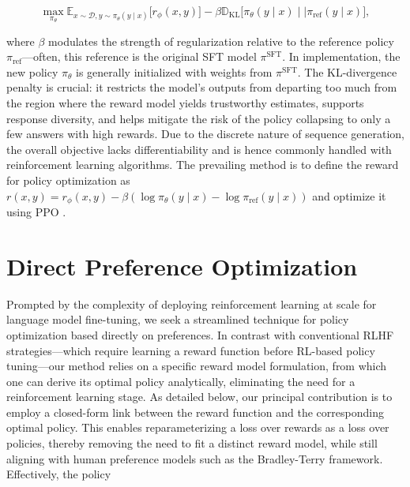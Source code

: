\begin{equation}\label{eq:RL}
\max_{\pi_{\theta}}  \mathbb{E}_{x\sim \mathcal{D}, y\sim \pi_{\theta}(y \mid x)}\bigl[r_{\phi}(x, y)\bigr] - \beta\mathbb{D}_{\textrm{KL}}\bigl[\pi_{\theta}(y\mid x)\mid \mid \pi_\text{ref}(y\mid x)\bigr],
\end{equation}

where $\beta$ modulates the strength of regularization relative to the reference policy $\pi_\text{ref}$—often, this reference is the original SFT model $\pi^\text{SFT}$. In implementation, the new policy $\pi_\theta$ is generally initialized with weights from $\pi^\text{SFT}$. The KL-divergence penalty is crucial: it restricts the model’s outputs from departing too much from the region where the reward model yields trustworthy estimates, supports response diversity, and helps mitigate the risk of the policy collapsing to only a few answers with high rewards. Due to the discrete nature of sequence generation, the overall objective lacks differentiability and is hence commonly handled with reinforcement learning algorithms. The prevailing method \citep{ziegler2020finetuning, stiennon2022learning, bai2022training, ouyang2022training} is to define the reward for policy optimization as ${r(x, y) = r_{\phi}(x, y) -\beta (\log \pi_{\theta}(y\mid x) - \log \pi_\text{ref}(y\mid x))}$ and optimize it using PPO \cite{schulman2017proximal}.

\section{Direct Preference Optimization}\label{sec:DPO}

Prompted by the complexity of deploying reinforcement learning at scale for language model fine-tuning, we seek a streamlined technique for policy optimization based directly on preferences. In contrast with conventional RLHF strategies—which require learning a reward function before RL-based policy tuning—our method relies on a specific reward model formulation, from which one can derive its optimal policy analytically, eliminating the need for a reinforcement learning stage. As detailed below, our principal contribution is to employ a closed-form link between the reward function and the corresponding optimal policy. This enables reparameterizing a loss over rewards as a loss over policies, thereby removing the need to fit a distinct reward model, while still aligning with human preference models such as the Bradley-Terry framework. Effectively, the policy

